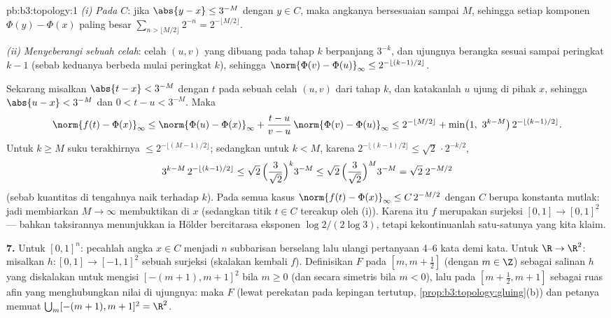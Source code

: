 \begin{solution}{pb:b3:topology:1}
\emph{(i) Pada $C$}: jika $\abs{y - x} \leq 3^{-M}$ dengan $y \in C$,
maka angkanya bersesuaian sampai $M$, sehingga setiap komponen $\Phi(y)
- \Phi(x)$ paling besar $\sum_{n > \lfloor M/2\rfloor} 2^{-n} =
2^{-\lfloor M/2\rfloor}$.

\emph{(ii) Menyeberangi sebuah celah}: celah $(u,v)$ yang dibuang pada tahap $k$
berpanjang $3^{-k}$, dan ujungnya berangka sesuai sampai
peringkat $k - 1$ (sebab keduanya berbeda mulai peringkat $k$), sehingga
$\norm{\Phi(v) - \Phi(u)}_\infty \leq
2^{-\lfloor (k-1)/2\rfloor}$.

Sekarang misalkan $\abs{t - x} < 3^{-M}$ dengan $t$ pada sebuah celah $(u, v)$ dari
tahap $k$, dan katakanlah $u$ ujung di pihak $x$, sehingga
$\abs{u - x} < 3^{-M}$ dan $0 < t - u < 3^{-M}$. Maka
\[
\norm{f(t) - \Phi(x)}_\infty
\leq \norm{\Phi(u) - \Phi(x)}_\infty
+ \frac{t - u}{v - u}\,\norm{\Phi(v) - \Phi(u)}_\infty
\leq 2^{-\lfloor M/2\rfloor} + \min\bigl(1,\ 3^{k - M}\bigr)\,
2^{-\lfloor(k-1)/2\rfloor} .
\]
Untuk $k \geq M$ suku terakhirnya $\leq 2^{-\lfloor(M-1)/2
\rfloor}$; sedangkan untuk $k < M$, karena $2^{-\lfloor(k-1)/2\rfloor} \leq
\sqrt2\,\cdot 2^{-k/2}$,
\[
3^{k-M}\,2^{-\lfloor(k-1)/2\rfloor}
\leq \sqrt2\,\Bigl(\frac{3}{\sqrt2}\Bigr)^{k} 3^{-M}
\leq \sqrt2\,\Bigl(\frac{3}{\sqrt2}\Bigr)^{M} 3^{-M}
= \sqrt2\; 2^{-M/2}
\]
(sebab kuantitas di tengahnya naik terhadap $k$). Pada semua kasus
$\norm{f(t) - \Phi(x)}_\infty \leq C\,2^{-M/2}$
dengan $C$ berupa konstanta mutlak: jadi membiarkan $M \to \infty$ membuktikan
 di $x$ (sedangkan titik $t \in C$ tercakup oleh (i)). Karena itu
$f$ merupakan surjeksi  $[0,1] \to [0,1]^2$ --- bahkan
taksirannya menunjukkan ia Hölder bercitarasa eksponen $\log 2/(2\log
3)$, tetapi kekontinuanlah satu-satunya yang kita klaim.

\textbf{7.} Untuk $[0,1]^n$: pecahlah angka $x \in C$ menjadi
$n$ subbarisan berselang lalu ulangi pertanyaan 4--6
kata demi kata. Untuk $\R \to \R^2$: misalkan $h \colon [0,1] \to [-1,1]^2$
sebuah surjeksi  (skalakan kembali $f$). Definisikan $F$ pada $[m, m
+ \frac12]$ (dengan $m \in \Z$) sebagai salinan $h$ yang diskalakan untuk mengisi
$[-(m+1), m+1]^2$ bila $m \geq 0$ (dan secara simetris bila $m <
0$), lalu pada $[m + \frac12, m + 1]$ sebagai ruas afin yang
menghubungkan nilai di ujungnya: maka $F$  (lewat perekatan pada
kepingan tertutup, \cref{prop:b3:topology:gluing}(b)) dan petanya
memuat $\bigcup_m [-(m+1), m+1]^2 = \R^2$.


\end{solution}
